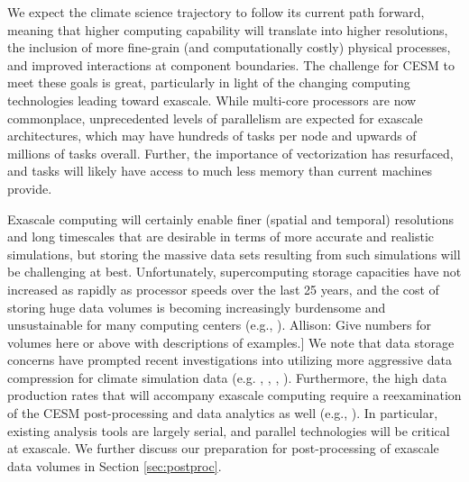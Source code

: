 We expect the climate science trajectory to follow its current path forward, meaning that higher computing capability will translate into higher resolutions, the inclusion of more fine-grain (and computationally costly) physical processes, and improved interactions at component boundaries. The challenge for CESM to meet these goals is great, particularly in light of the changing computing technologies leading toward exascale.  While multi-core processors are now commonplace, unprecedented levels of parallelism are expected for exascale architectures, which may have hundreds of tasks per node and upwards of millions of tasks overall.  Further, the importance of vectorization has resurfaced, and tasks will likely have access to much less memory than current machines provide.

Exascale computing will certainly enable finer (spatial and temporal) resolutions and long timescales that are desirable in terms of more accurate and realistic simulations, but storing the massive data sets resulting from such simulations will be challenging at best. Unfortunately, supercomputing storage capacities have not increased as rapidly as processor speeds over the last 25 years, and the cost of storing huge data volumes is becoming increasingly burdensome and unsustainable for many computing centers (e.g., \cite{kunkel2014}).  {\color{red} Allison:} Give numbers for volumes here or above with descriptions of examples.]  We note that data storage concerns have prompted recent investigations into utilizing more aggressive data compression for climate simulation data (e.g. \cite{baker2014}, \cite{baker2016-pepsi}, \cite{woodring11}, \cite{hubbe12}).  Furthermore, the high data production rates that will accompany exascale computing require a reexamination of the CESM post-processing and data analytics as well (e.g., \cite{paul2015}).  In particular, existing analysis tools are largely serial, and parallel technologies will be critical at exascale. We further discuss our preparation for post-processing of exascale data volumes in Section \ref{sec:postproc}.

